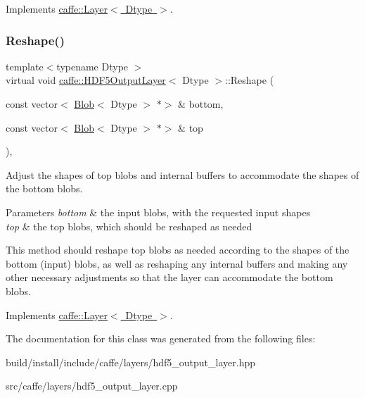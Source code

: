 Implements \mbox{\hyperlink{classcaffe_1_1_layer_a7fe981e8af8d93d587acf2a952be563d}{caffe\+::\+Layer$<$ Dtype $>$}}.

\mbox{\label{classcaffe_1_1_h_d_f5_output_layer_afaed17dc14251e627764334d54e55c4d}} 
\subsubsection{\texorpdfstring{Reshape()}{Reshape()}\hspace{0.1cm}{\footnotesize\ttfamily [2/2]}}
{\footnotesize\ttfamily template$<$typename Dtype $>$ \\
virtual void \mbox{\hyperlink{classcaffe_1_1_h_d_f5_output_layer}{caffe\+::\+H\+D\+F5\+Output\+Layer}}$<$ Dtype $>$\+::Reshape (\begin{DoxyParamCaption}\item[{const vector$<$ \mbox{\hyperlink{classcaffe_1_1_blob}{Blob}}$<$ Dtype $>$ $\ast$$>$ \&}]{bottom,  }\item[{const vector$<$ \mbox{\hyperlink{classcaffe_1_1_blob}{Blob}}$<$ Dtype $>$ $\ast$$>$ \&}]{top }\end{DoxyParamCaption})\hspace{0.3cm}{\ttfamily [inline]}, {\ttfamily [virtual]}}



Adjust the shapes of top blobs and internal buffers to accommodate the shapes of the bottom blobs. 


\begin{DoxyParams}{Parameters}
{\em bottom} & the input blobs, with the requested input shapes \\
\hline
{\em top} & the top blobs, which should be reshaped as needed\\
\hline
\end{DoxyParams}
This method should reshape top blobs as needed according to the shapes of the bottom (input) blobs, as well as reshaping any internal buffers and making any other necessary adjustments so that the layer can accommodate the bottom blobs. 

Implements \mbox{\hyperlink{classcaffe_1_1_layer_a7fe981e8af8d93d587acf2a952be563d}{caffe\+::\+Layer$<$ Dtype $>$}}.



The documentation for this class was generated from the following files\+:\begin{DoxyCompactItemize}
\item 
build/install/include/caffe/layers/hdf5\+\_\+output\+\_\+layer.\+hpp\item 
src/caffe/layers/hdf5\+\_\+output\+\_\+layer.\+cpp\end{DoxyCompactItemize}
